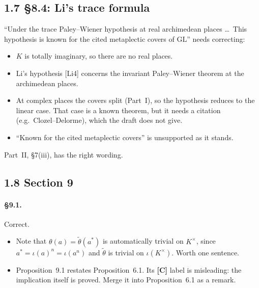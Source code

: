 \documentclass[11pt]{article}
\newcommand{\GL}{\mathrm{GL}}
\begin{document}
\subsection*{1.7 \S8.4: Li's trace formula}
``Under the trace Paley--Wiener hypothesis at real archimedean places
\ldots\ This hypothesis is known for the cited metaplectic covers of
$\GL$'' needs correcting:
\begin{itemize}
\item $K$ is totally imaginary, so there are no real places.
\item Li's hypothesis [Li4] concerns the invariant Paley--Wiener theorem at
the archimedean places.
\item At complex places the covers split (Part~I), so the hypothesis
reduces to the linear case. That case is a known theorem, but it needs a
citation (e.g.\ Clozel--Delorme), which the draft does not give.
\item ``Known for the cited metaplectic covers'' is unsupported as it
stands.
\end{itemize}
Part~II, \S7(iii), has the right wording.

\subsection*{1.8 Section 9}
\paragraph{\S9.1.} Correct.
\begin{itemize}
\item Note that $\theta(a)=\tilde\theta(a^*)$ is automatically trivial on
$K^\times$, since $a^*=\iota(a)^n=\iota(a^n)$ and $\tilde\theta$ is
trivial on $\iota(K^\times)$. Worth one sentence.
\item Proposition~9.1 restates Proposition~6.1. Its \textbf{[C]} label
is misleading: the implication itself is proved. Merge it into
Proposition~6.1 as a remark.
\end{itemize}
\end{document}
